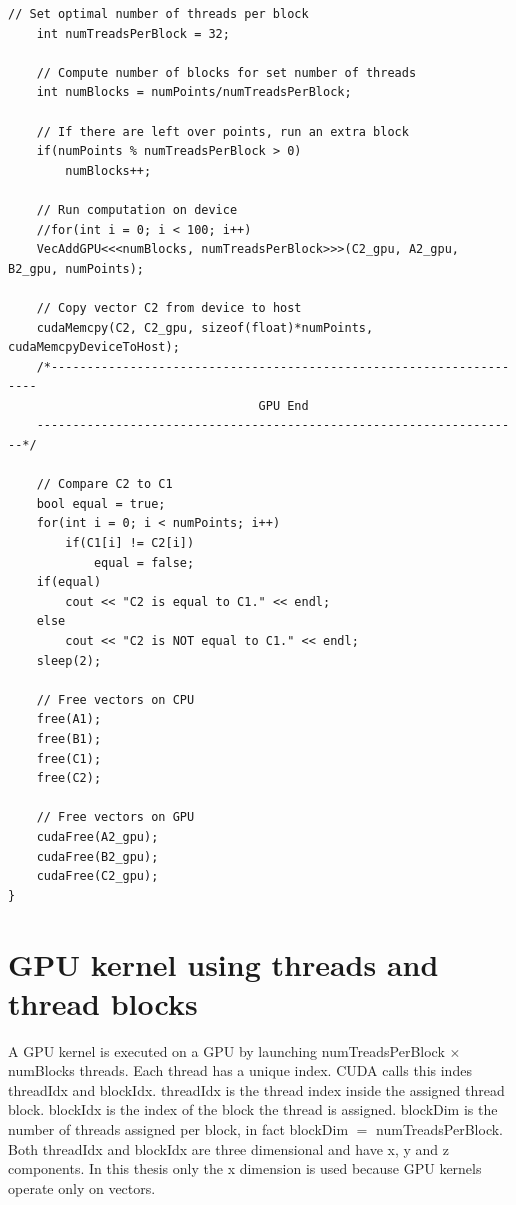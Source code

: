 \begin{lstlisting}[style=myCUDAstyle,caption={Comparison of CPU verse GPU code.},label={code:GPUvsCPU}]
	// Set optimal number of threads per block
	int numTreadsPerBlock = 32;

	// Compute number of blocks for set number of threads
	int numBlocks = numPoints/numTreadsPerBlock;

	// If there are left over points, run an extra block
	if(numPoints % numTreadsPerBlock > 0)
		numBlocks++;

	// Run computation on device
	//for(int i = 0; i < 100; i++)
	VecAddGPU<<<numBlocks, numTreadsPerBlock>>>(C2_gpu, A2_gpu, B2_gpu, numPoints);

	// Copy vector C2 from device to host
	cudaMemcpy(C2, C2_gpu, sizeof(float)*numPoints, cudaMemcpyDeviceToHost);
	/*--------------------------------------------------------------------
                               	   GPU End
	--------------------------------------------------------------------*/

	// Compare C2 to C1
	bool equal = true;
	for(int i = 0; i < numPoints; i++)
		if(C1[i] != C2[i])
			equal = false;
	if(equal)
		cout << "C2 is equal to C1." << endl;
	else
		cout << "C2 is NOT equal to C1." << endl;
	sleep(2);

	// Free vectors on CPU
	free(A1);
	free(B1);
	free(C1);
	free(C2);

	// Free vectors on GPU
	cudaFree(A2_gpu);
	cudaFree(B2_gpu);
	cudaFree(C2_gpu);
}
\end{lstlisting}
\doublespacing

\section{GPU kernel using threads and thread blocks}
A GPU kernel is executed on a GPU by launching numTreadsPerBlock $\times$ numBlocks 
threads.
Each thread has a unique index.
CUDA calls this indes threadIdx and blockIdx.
threadIdx is the thread index inside the assigned thread block.
blockIdx is the index of the block the thread is assigned.
blockDim is the number of threads assigned per block, in fact blockDim $=$ numTreadsPerBlock.
Both threadIdx and blockIdx are three dimensional and have x, y and z components.
In this thesis only the x dimension is used because GPU kernels operate only on vectors.

